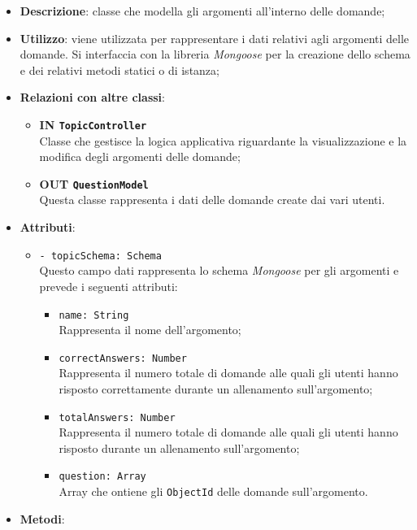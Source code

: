 \begin{itemize}
	\item \textbf{Descrizione}: classe che modella gli argomenti all'interno delle domande;
	\item \textbf{Utilizzo}:	viene utilizzata per rappresentare i dati relativi agli argomenti delle domande. Si interfaccia con la libreria \textit{Mongoose} per la creazione dello schema e dei relativi metodi statici o di istanza;
	\item \textbf{Relazioni con altre classi}:
		\begin{itemize}
			\item \textbf{IN \texttt{TopicController}} \\
			Classe che gestisce la logica applicativa riguardante la visualizzazione e la modifica degli argomenti delle domande;
			\item \textbf{OUT \texttt{QuestionModel}} \\
			Questa classe rappresenta i dati delle domande create dai vari utenti.
		\end{itemize}
	\item \textbf{Attributi}:
		\begin{itemize}
			\item \texttt{- topicSchema: Schema} \\
			Questo campo dati rappresenta lo schema \textit{Mongoose} per gli argomenti e prevede i seguenti attributi:
				\begin{itemize}
					\item \texttt{name: String}\\ Rappresenta il nome dell'argomento;
					\item \texttt{correctAnswers: Number}\\ Rappresenta il numero totale di domande alle quali gli utenti hanno risposto correttamente durante un allenamento sull'argomento; 
					\item \texttt{totalAnswers: Number}\\ Rappresenta il numero totale di domande alle quali gli utenti hanno risposto durante un allenamento sull'argomento;
					\item \texttt{question: Array}\\ Array che ontiene gli \texttt{ObjectId} delle domande sull'argomento.
				\end{itemize}
		\end{itemize}
	\item \textbf{Metodi}:
		\begin{itemize}

\end{itemize}
\end{itemize}
